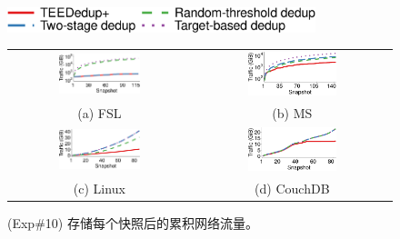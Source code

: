 \begin{figure}[!htb]
    \centering
    \includegraphics[width=0.8\textwidth]{pic/featurespy/plot/bandwidth/upload_traffic_legend.pdf}     \vspace{3pt} \\
    \begin{tabular}{@{\ }c@{\ }c}
        \includegraphics[width=0.47\textwidth]{pic/featurespy/plot/bandwidth/upload_traffic_fsl.pdf} &
        \includegraphics[width=0.47\textwidth]{pic/featurespy/plot/bandwidth/upload_traffic_ms.pdf} \\
        {\small (a) FSL} & {\small (b) MS} \\
        \includegraphics[width=0.47\textwidth]{pic/featurespy/plot/bandwidth/upload_traffic_linux.pdf} &
        \includegraphics[width=0.47\textwidth]{pic/featurespy/plot/bandwidth/upload_traffic_couch.pdf} \\
        {\small (c) Linux} & {\small (d) CouchDB}
    \end{tabular}
    \caption{(Exp\#10) 存储每个快照后的累积网络流量。}
    \label{fig:featurespy-expNetworkTraffic}
\end{figure}

